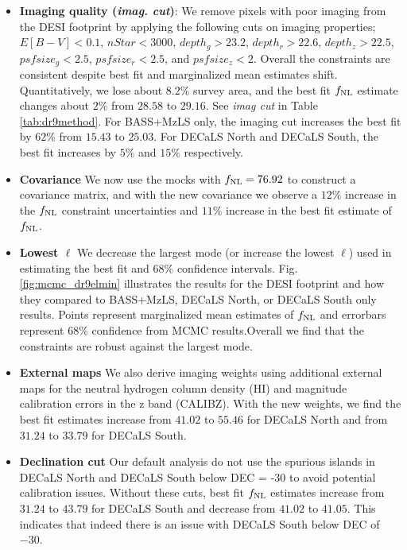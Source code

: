 \begin{itemize}
\item \textbf{Imaging quality (\textit{imag. cut})}: We remove pixels with poor imaging from the DESI footprint by applying the following cuts on imaging properties; $E[B-V]<0.1$, $nStar < 3000$, $depth_{g} > 23.2$, $depth_{r} > 22.6$, $depth_{z} > 22.5$, $psfsize_{g}<2.5$, $psfsize_{r}<2.5$, and $psfsize_{z}<2$. Overall the constraints are consistent despite best fit and marginalized mean estimates shift. Quantitatively, we lose about $8.2\%$ survey area, and the best fit $f_{\rm NL}$ estimate changes about $2\%$ from $28.58$ to $29.16$. See \textit{imag cut} in Table \ref{tab:dr9method}. For BASS+MzLS only, the imaging cut increases the best fit by $62\%$ from $15.43$ to $25.03$. For DECaLS North and DECaLS South, the best fit increases by $5\%$ and $15\%$ respectively.

\item \textbf{Covariance}
We now use the mocks with $f_{\rm NL}=76.92$ to construct a covariance matrix, and with the new covariance we observe a $12\%$ increase in the $f_{\rm NL}$ constraint uncertainties and $11\%$ increase in the best fit estimate of $f_{\rm NL}$.

\item \textbf{Lowest $\ell$} 
We decrease the largest mode (or increase the lowest $\ell$) used in estimating the best fit and $68\%$ confidence intervals. Fig. \ref{fig:mcmc_dr9elmin} illustrates the results for the DESI footprint and how they compared to BASS+MzLS, DECaLS North, or DECaLS South only results. Points represent marginalized mean estimates of $f_{\rm NL}$ and errorbars represent $68$\% confidence from MCMC results.Overall we find that the constraints are robust against the largest mode.

\item \textbf{External maps} We also derive imaging weights using additional external maps for the neutral hydrogen column density (HI) and magnitude calibration errors in the z band (CALIBZ). With the new weights, we find the best fit estimates increase from $41.02$ to $55.46$ for DECaLS North and from $31.24$ to $33.79$ for DECaLS South.

\item \textbf{Declination cut} Our default analysis do not use the spurious islands in DECaLS North and DECaLS South below DEC = -30 to avoid potential calibration issues.  Without these cuts, best fit $f_{\rm NL}$ estimates increase from $31.24$ to $43.79$ for DECaLS South and decrease from $41.02$ to $41.05$. This indicates that indeed there is an issue with DECaLS South below DEC of $-30$.

\end{itemize}


